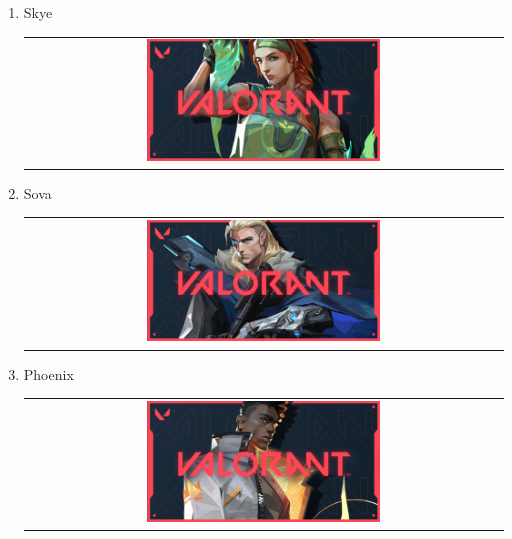 \documentclass[a4paper, 12pt]{article}
\begin{document}
\begin{enumerate}
\begin{tabular}{c}
    {Brimstone.png}
    \end{tabular}
    \item Skye
    \begin{figure}[H]
        \centering
    \end{figure}
    \begin{tabular}{c}
    \includegraphics[width=0.5\textwidth]
    {Skye.png}
    \end{tabular}
    \item Sova
    \begin{figure}[H]
        \centering
    \end{figure}
    \begin{tabular}{c}
    \includegraphics[width=0.5\textwidth]
    {Sova.png}
    \end{tabular}
    \item Phoenix
    \begin{figure}[H]
        \centering
    \end{figure}
    \begin{tabular}{c}
    \includegraphics[width=0.5\textwidth]
    {Phoenix.png}
    \end{tabular}
\end{enumerate}
\end{document}
